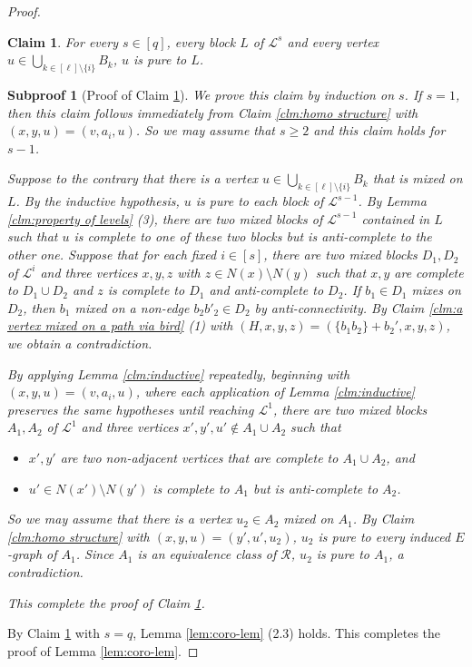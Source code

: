 \documentclass[10pt,a4paper]{amsart}
\newtheorem{claim}{Claim}
\newtheorem{subproof}{Subproof}
\begin{document}
\begin{proof}
        \begin{claim}\label{clm:homo blocks}
            For every $s\in[q]$, every block $L$ of $\mathcal{L}^s$ and every vertex $u\in \bigcup_{k\in [\ell]\setminus \{i\}} B_k$, $u$ is pure to $L$.
        \end{claim}
        \begin{subproof}[Proof of Claim \ref{clm:homo blocks}]
            We prove this claim by induction on $s$. 
            If $s=1$, then this claim follows immediately from Claim \ref{clm:homo structure} with $(x,y,u)=(v,a_i,u)$. 
            So we may assume that $s\ge 2$ and this claim holds for $s-1$.

            Suppose to the contrary that there is a vertex $u\in \bigcup_{k\in [\ell]\setminus \{i\}} B_k$ that is mixed on $L$.  
            By the inductive hypothesis, $u$ is pure to each block of $\mathcal{L}^{s-1}$. 
            By Lemma \ref{clm:property of levels} (3), there are two mixed blocks of $\mathcal{L}^{s-1}$ contained in $L$ such that $u$ is complete to one of these two blocks but is anti-complete to the other one. 
            Suppose that for each fixed $i\in [s]$, there are two mixed blocks $D_1,D_2$ of $\mathcal{L}^i$ and three vertices $x,y,z$ with $z\in N(x)\setminus N(y)$ such that $x,y$ are complete to $D_1\cup D_2$ and $z$ is complete to $D_1$ and anti-complete to $D_2$. If $b_1\in D_1$ mixes on $D_2$, then $b_1$ mixed on a non-edge $b_2b'_2\in D_2$ by anti-connectivity. 
            By Claim \ref{clm:a vertex mixed on a path via bird} (1) with $(H,x,y,z)=(\{b_1b_2\}+b_2',x,y,z)$, we obtain a contradiction.

            By applying Lemma \ref{clm:inductive} repeatedly, beginning with $(x,y,u)=(v,a_i,u)$, where each application of Lemma \ref{clm:inductive} preserves the same hypotheses until reaching $\mathcal{L}^1$, there are two mixed blocks $A_1,A_2$ of $\mathcal{L}^1$ and three vertices $x',y',u'\notin A_1\cup A_2$ such that 
            \begin{itemize}
                \item $x',y'$ are two non-adjacent vertices that are complete to $A_1\cup A_2$, and
                \item $u'\in N(x')\setminus N(y')$ is complete to $A_1$ but is anti-complete to $A_2$.  
            \end{itemize}
            
            So we may assume that there is a vertex $u_2\in A_2$ mixed on $A_1$. 
            By Claim \ref{clm:homo structure} with $(x,y,u)=(y',u',u_2)$, $u_2$ is pure to every induced $E$-graph of $A_1$. 
            Since $A_1$ is an equivalence class of $\mathcal{R}$, $u_2$ is pure to $A_1$, a contradiction.  
            
            This complete the proof of Claim \ref{clm:homo blocks}. 
        \end{subproof} 

        By Claim \ref{clm:homo blocks} with $s=q$, Lemma \ref{lem:coro-lem} (2.3) holds.
        This completes the proof of Lemma \ref{lem:coro-lem}. 
    \end{proof}
\end{document}
